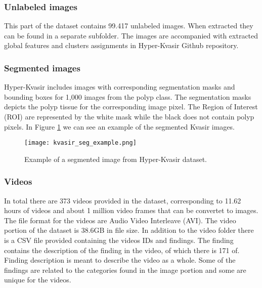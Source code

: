 \documentclass[thesis.tex]{subfiles}
\begin{document}

\subsubsection{Unlabeled images}
This part of the dataset contains 99.417 unlabeled images. When extracted they can be found in a separate subfolder. The images are accompanied with extracted global features and clusters assignments in Hyper-Kvasir Github repository. 

\subsubsection{Segmented images}
Hyper-Kvasir includes images with corresponding segmentation masks and bounding boxes for 1,000 images from the polyp class. The segmentation masks depicts the polyp tissue for the corresponding image pixel. The Region of Interest (ROI) are represented by the white mask while the black does not contain polyp pixels. In Figure \ref{fig:kvasir_seg_example} we can see an example of the segmented Kvasir images.

\begin{figure}[H] %
  \begin{center}
    \texttt{[image: kvasir\_seg\_example.png]}
    \caption{Example of a segmented image from Hyper-Kvasir dataset.}
    \label{fig:kvasir_seg_example}
  \end{center}
\end{figure}


\subsubsection{Videos}
In total there are 373 videos provided in the dataset, corresponding to 11.62 hours of videos and about 1 million video frames that can be convertet to images. The file format for the videos are Audio Video Interleave (AVI). The video portion of the dataset is 38.6GB in file size. In addition to the video folder there is a CSV file provided containing the videos IDs and findings. The finding contains the description of the finding in the video, of which there is 171 of. Finding description is meant to describe the video as a whole. Some of the findings are related to the categories found in the image portion and some are unique for the videos.
\end{document}
